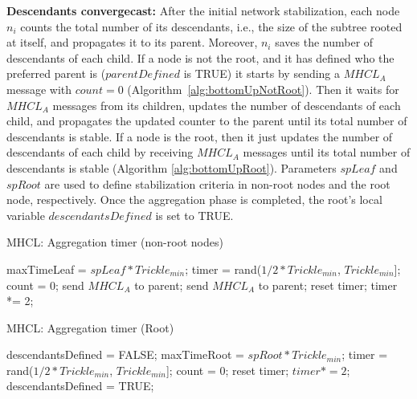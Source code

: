 \textbf{Descendants convergecast:} After the initial network stabilization, each node $n_i$ counts the total number of its descendants, i.e., the size of the subtree rooted at itself, and propagates it to its parent. Moreover, $n_i$ saves the number of descendants of each child. If a node is not the root, and it has defined who the preferred parent is ($parentDefined$ is TRUE) it starts by sending a $MHCL_{A}$ message with $count=0$ (Algorithm~\ref{alg:bottomUpNotRoot}). Then it waits for $MHCL_{A}$ messages from its children, updates the number of descendants of each child, and propagates the updated counter to the parent until its total number of descendants is stable. If a node is the root, then it just updates the number of descendants of each child by receiving  $MHCL_{A}$ messages until its total number of descendants is stable (Algorithm \ref{alg:bottomUpRoot}). Parameters $spLeaf$ and $spRoot$ are used to define stabilization criteria in non-root nodes and the root node, respectively. Once the aggregation phase is completed, the root's local variable $descendantsDefined$ is set to TRUE.

\begin{algorithm}[!t]
\caption{MHCL: Aggregation
timer (non-root nodes)}\label{alg:bottomUpNotRoot}
\begin{algorithmic}[1]
  \State maxTimeLeaf = $spLeaf*Trickle_{min}$;
  \State timer = rand($1/2 * Trickle_{min}$, $Trickle_{min}$]; 
  \State count = 0; 
\State {}
            \State send $MHCL_{A}$ to parent; 
        \EndIf
            \State send $MHCL_{A}$ to parent;
            \State reset timer;
        \Else    {} %
                    \State timer *= 2;
                \EndIf
        \EndIf
\EndIf
\EndWhile
\end{algorithmic}
\end{algorithm}

\begin{algorithm}[!t]
\caption{MHCL: Aggregation timer (Root)}\label{alg:bottomUpRoot}
\begin{algorithmic}[1]
  \State descendantsDefined = FALSE;
  \State maxTimeRoot = $spRoot *Trickle_{min}$;
  \State timer = rand($1/2 * Trickle_{min}$, $Trickle_{min}$]; 
  \State count = 0; 
            \State reset timer;
        \Else
                \State $timer *= 2$;
            \Else
                \State descendantsDefined = TRUE;
            \EndIf
        \EndIf
\EndIf
\EndWhile
\end{algorithmic}
\end{algorithm}


